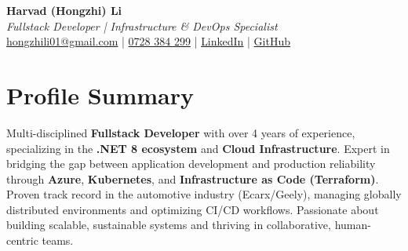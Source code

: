 \documentclass[11pt,a4paper]{article}
\begin{document}
\pagestyle{empty}

\begin{center}
{\LARGE \textbf{Harvad (Hongzhi) Li}}\\[10pt]
{\Large \textit{Fullstack Developer | Infrastructure & DevOps Specialist}}\\[10pt]
\textcolor{linkedinblue}{\href{mailto:hongzhili01@gmail.com}{hongzhili01@gmail.com} | \href{tel:0728384299}{0728 384 299} | \href{https://www.linkedin.com/in/harvad/}{LinkedIn} | \href{https://github.com/bluehawana}{GitHub}}
\end{center}

\section*{Profile Summary}
Multi-disciplined \textbf{Fullstack Developer} with over 4 years of experience, specializing in the \textbf{.NET 8 ecosystem} and \textbf{Cloud Infrastructure}. Expert in bridging the gap between application development and production reliability through \textbf{Azure}, \textbf{Kubernetes}, and \textbf{Infrastructure as Code (Terraform)}. Proven track record in the automotive industry (Ecarx/Geely), managing globally distributed environments and optimizing CI/CD workflows. Passionate about building scalable, sustainable systems and thriving in collaborative, human-centric teams.

\end{document}
